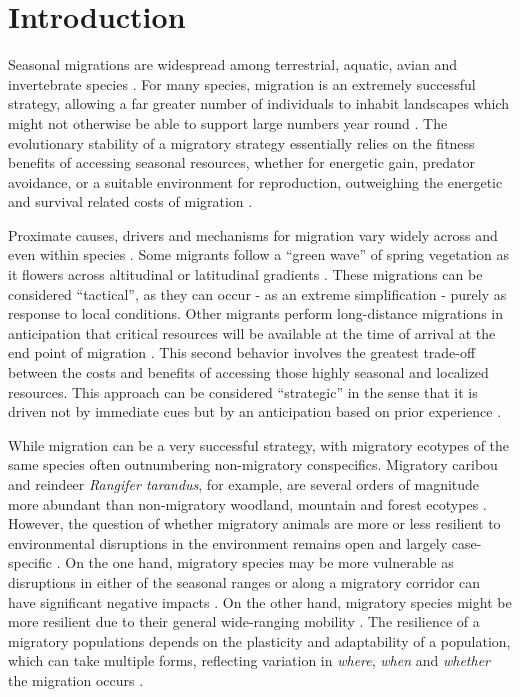 \documentclass[utf8]{frontiersSCNS} %
\begin{document}
\section{Introduction}
	
	Seasonal migrations are widespread among terrestrial, aquatic, avian and invertebrate species \citep{Dingle2014}. For many species, migration is an extremely successful strategy, allowing a far greater number of individuals to inhabit landscapes which might not otherwise be able to support large numbers year round \citep{Fryxell1988}. The evolutionary stability of a migratory strategy essentially relies on the fitness benefits of accessing seasonal resources, whether for energetic gain, predator avoidance, or a suitable  environment for reproduction, outweighing the energetic and survival related costs of migration \citep{Avgar2014}. 
	
	Proximate causes, drivers and mechanisms for migration vary widely across and even within species \citep{Berthold1999, Shaw2016}. Some migrants follow a ``green wave'' of spring vegetation as it flowers across altitudinal or latitudinal gradients \citep{Bischof2012, Kolzsch2015, Merkle2016}. These migrations can be considered ``tactical'', as they can occur - as an extreme simplification - purely as response to local conditions. Other migrants perform long-distance migrations in anticipation that critical resources will be available at the time of arrival at the end point of migration \citep{Abrahms2019}. This second behavior involves the greatest trade-off between the costs and benefits of accessing those highly seasonal and localized resources. This approach can be considered ``strategic'' in the sense that it is driven not by immediate cues but by an anticipation based on prior experience \citep{Bracis2017, Merkle2019, Bauer2020}. 

	While migration can be a very successful strategy, with migratory ecotypes of the same species often outnumbering non-migratory conspecifics.  Migratory caribou and reindeer \emph{Rangifer tarandus}, for example, are several orders of magnitude more abundant than non-migratory woodland, mountain and forest ecotypes \citep{FestaBianchet2011,Uboni2016}. However, the question of whether migratory animals are more or less resilient to environmental disruptions in the environment remains open and largely case-specific \citep{Moore2008, HardestyMoore2018, Xu2021}. On the one hand, migratory species may be more vulnerable as disruptions in either of the seasonal ranges or along a migratory corridor can have significant negative impacts \citep{Wilcove2008, Seebacher2015, Kauffman2021}. On the other hand, migratory species might be more resilient due to their general wide-ranging mobility \citep{Robinson2009}. The resilience of a migratory populations depends on the plasticity and adaptability of a population, which can take multiple forms, reflecting variation in \textit{where}, \textit{when} and \textit{whether} the migration occurs \citep{Gurarie2017, Xu2021}. 
	
\end{document}
